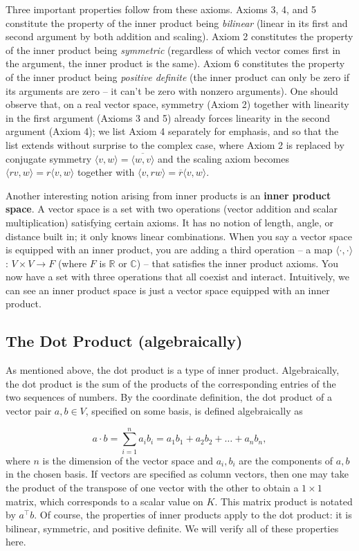 \documentclass{article}
\begin{document}
Three important properties follow from these axioms. Axioms 3, 4, and 5 constitute the property of the inner product being \textit{bilinear} (linear in its first and second argument by both addition and scaling). Axiom 2 constitutes the property of the inner product being \textit{symmetric} (regardless of which vector comes first in the argument, the inner product is the same). Axiom 6 constitutes the property of the inner product being \textit{positive definite} (the inner product can only be zero if its arguments are zero -- it can't be zero with nonzero arguments). One should observe that, on a real vector space, symmetry (Axiom 2) together with linearity in the first argument (Axioms 3 and 5) already forces linearity in the second argument (Axiom 4); we list Axiom 4 separately for emphasis, and so that the list extends without surprise to the complex case, where Axiom 2 is replaced by conjugate symmetry $\langle v, w \rangle = \overline{\langle w, v \rangle}$ and the scaling axiom becomes $\langle r v, w \rangle = r \langle v, w \rangle$ together with $\langle v, r w \rangle = \overline{r} \langle v, w \rangle$.

Another interesting notion arising from inner products is an \textbf{inner product space}. A vector space is a set with two operations (vector addition and scalar multiplication) satisfying certain axioms. It has no notion of length, angle, or distance built in; it only knows linear combinations. When you say a vector space is equipped with an inner product, you are adding a third operation -- a map $\langle \cdot,\cdot \rangle$ : $V \times V \rightarrow F$ (where $F$ is $\mathbb{R}$ or $\mathbb{C}$) -- that satisfies the inner product axioms. You now have a set with three operations that all coexist and interact. Intuitively, we can see an inner product space is just a vector space equipped with an inner product. 

\subsection{The Dot Product (algebraically)}

As mentioned above, the dot product is a type of inner product. Algebraically, the dot product is the sum of the products of the corresponding entries of the two sequences of numbers. By the coordinate definition, the dot product of a vector pair $a,b \in V$, specified on some basis, is defined algebraically as 

$$a \cdot b = \sum_{i=1}^n a_i b_i = a_1 b_1 + a_2 b_2 + \dots + a_n b_n,$$
where $n$ is the dimension of the vector space and $a_i, b_i$ are the components of $a, b$ in the chosen basis. If vectors are specified as column vectors, then one may take the product of the transpose of one vector with the other to obtain a $1 \times 1$ matrix, which corresponds to a scalar value on $K$. This matrix product is notated by $a^\top b$. Of course, the properties of inner products apply to the dot product: it is bilinear, symmetric, and positive definite. We will verify all of these properties here.
\end{document}
